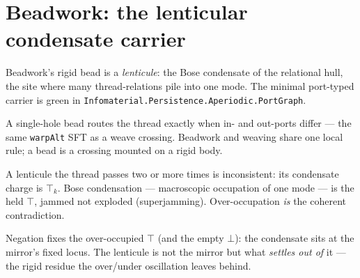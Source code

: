 \section{Beadwork: the lenticular condensate carrier}

Beadwork's rigid bead is a \emph{lenticule}: the Bose condensate of the relational hull, the site
where many thread-relations pile into one mode. The minimal port-typed carrier is green in
\texttt{Infomaterial.Persistence.Aperiodic.PortGraph}.

\begin{theorem}\label{thm:lenticule-hole}\leanok{}
A single-hole bead routes the thread exactly when in- and out-ports differ --- the same
\texttt{warpAlt} SFT as a weave crossing. Beadwork and weaving share one local rule; a bead is a
crossing mounted on a rigid body.
\end{theorem}

\begin{theorem}\label{thm:condensate-is-top}\leanok{}
A lenticule the thread passes two or more times is inconsistent: its condensate charge is $\top_k$.
Bose condensation --- macroscopic occupation of one mode --- is the held $\top$, jammed not
exploded (superjamming). Over-occupation \emph{is} the coherent contradiction.
\end{theorem}

\begin{theorem}\label{thm:condensate-from-mirror}\leanok{}
Negation fixes the over-occupied $\top$ (and the empty $\bot$): the condensate sits at the mirror's
fixed locus. The lenticule is not the mirror but what \emph{settles out of} it --- the rigid residue
the over/under oscillation leaves behind.
\end{theorem}
